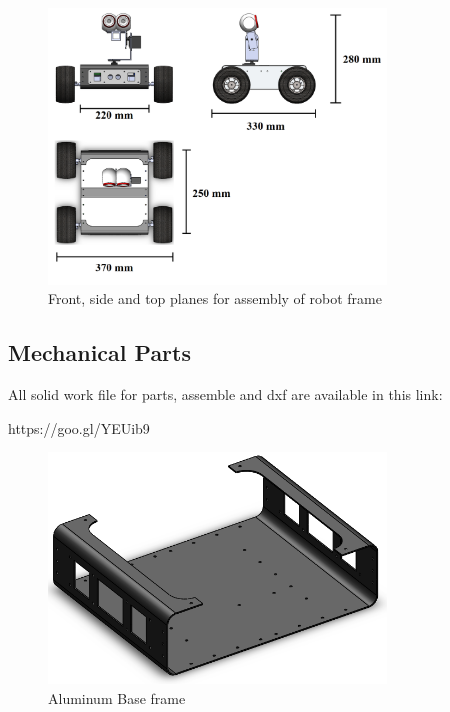 \documentclass[12pt]{article}
\begin{document}
\begin{figure}[H]
	\centering
	\includegraphics[width =0.8\textwidth]{Fig/solid/solid-planes.png}
	\caption{Front, side and top planes for assembly of robot frame}
	\label{fig:frame-planes}
\end{figure}



\newpage

\subsection{Mechanical Parts}
All solid work file for parts, assemble and dxf are available in this link:
\begin{center}
 https://goo.gl/YEUib9
\end{center}

\begin{figure}[H]
	\centering
	\includegraphics[width =0.8\textwidth]{Fig/solid/frame-3d.png}
	\caption{Aluminum Base frame}
\end{figure}
\end{document}
